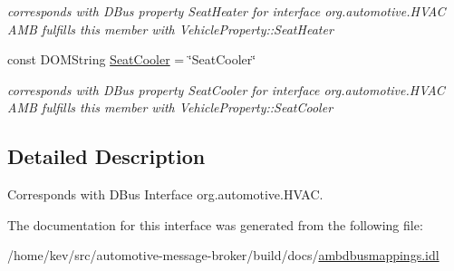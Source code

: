 \begin{DoxyCompactItemize}
\begin{DoxyCompactList}\small\item\em corresponds with D\+Bus property Seat\+Heater for interface org.\+automotive.\+H\+V\+A\+C A\+M\+B fulfills this member with Vehicle\+Property\+::\+Seat\+Heater \end{DoxyCompactList}\item 
\hypertarget{interfaceHVAC_a88527992264def26ff4df3e415ad3579}{const D\+O\+M\+String \hyperlink{interfaceHVAC_a88527992264def26ff4df3e415ad3579}{Seat\+Cooler} = \char`\"{}Seat\+Cooler\char`\"{}}\label{interfaceHVAC_a88527992264def26ff4df3e415ad3579}

\begin{DoxyCompactList}\small\item\em corresponds with D\+Bus property Seat\+Cooler for interface org.\+automotive.\+H\+V\+A\+C A\+M\+B fulfills this member with Vehicle\+Property\+::\+Seat\+Cooler \end{DoxyCompactList}\end{DoxyCompactItemize}


\subsection{Detailed Description}
Corresponds with D\+Bus Interface org.\+automotive.\+H\+V\+A\+C. 

The documentation for this interface was generated from the following file\+:\begin{DoxyCompactItemize}
\item 
/home/kev/src/automotive-\/message-\/broker/build/docs/\hyperlink{ambdbusmappings_8idl}{ambdbusmappings.\+idl}\end{DoxyCompactItemize}

